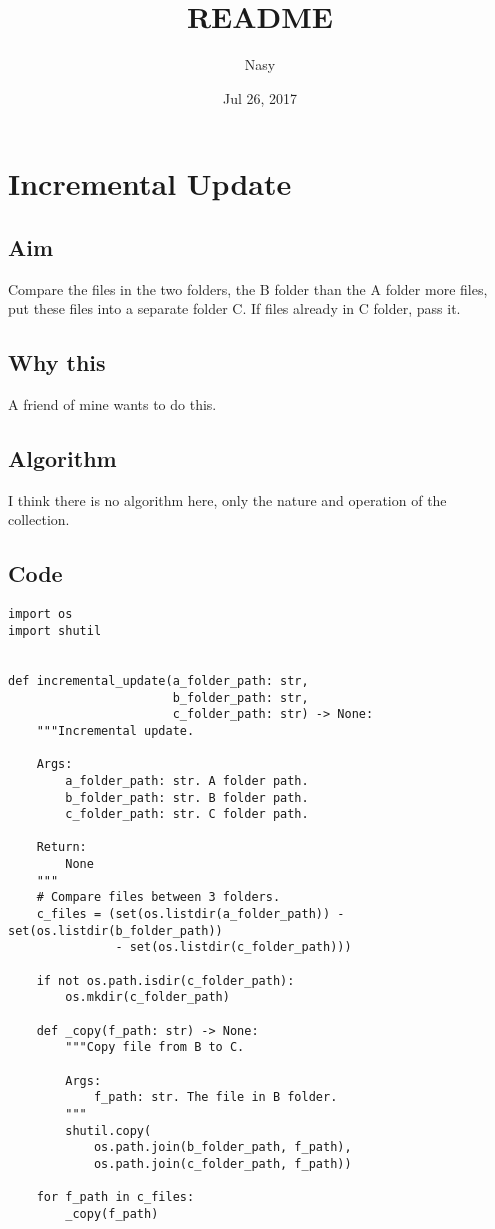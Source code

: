 \documentclass[11pt]{article}
\author{Nasy}
\date{Jul 26, 2017}
\title{README}
\begin{document}
\maketitle

\section{Incremental Update}
\label{sec-1}

\subsection{Aim}
\label{sec-1-1}
Compare the files in the two folders, the B folder than the A folder more files, put these files into a separate folder C. If files already in C folder, pass it.

\subsection{Why this}
\label{sec-1-2}
A friend of mine wants to do this.

\subsection{Algorithm}
\label{sec-1-3}
I think there is no algorithm here, only the nature and operation of the collection.

\subsection{Code}
\label{sec-1-4}

\begin{verbatim}
import os
import shutil


def incremental_update(a_folder_path: str,
                       b_folder_path: str,
                       c_folder_path: str) -> None:
    """Incremental update.

    Args:
        a_folder_path: str. A folder path.
        b_folder_path: str. B folder path.
        c_folder_path: str. C folder path.

    Return:
        None
    """
    # Compare files between 3 folders.
    c_files = (set(os.listdir(a_folder_path)) - set(os.listdir(b_folder_path))
               - set(os.listdir(c_folder_path)))

    if not os.path.isdir(c_folder_path):
        os.mkdir(c_folder_path)

    def _copy(f_path: str) -> None:
        """Copy file from B to C.

        Args:
            f_path: str. The file in B folder.
        """
        shutil.copy(
            os.path.join(b_folder_path, f_path),
            os.path.join(c_folder_path, f_path))

    for f_path in c_files:
        _copy(f_path)
\end{verbatim}
\end{document}
